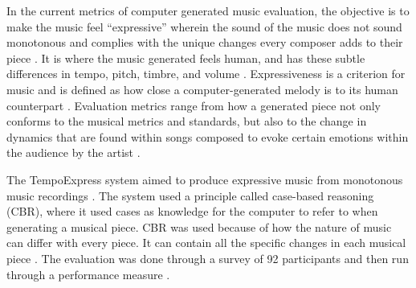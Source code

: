 
In the current metrics of computer generated music evaluation, the objective is to make the music feel “expressive” wherein the sound of the music does not sound monotonous and complies with the unique changes every composer adds to their piece \citep{de2002ai}. It is where the music generated feels human, and has these subtle differences in tempo, pitch, timbre, and volume \citep{bresin2000emotional}. Expressiveness is a criterion for music and is defined as how close a computer-generated melody is to its human counterpart \citep{de2002ai}. Evaluation metrics range from how a generated piece not only conforms to the musical metrics and standards, but also to the change in dynamics that are found within songs composed to evoke certain emotions within the audience by the artist \citep{bresin2000emotional}. 


The TempoExpress system aimed to produce expressive music from monotonous music recordings \citep{grachten2006a}. The system used a principle called case-based reasoning (CBR), where it used cases as knowledge for the computer to refer to when generating a musical piece. CBR was used because of how the nature of music can differ with every piece. It can contain all the specific changes in each musical piece \citep{de2012playing}. The evaluation was done through a survey of 92 participants and then run through a performance measure \citep{grachten2006a}.

